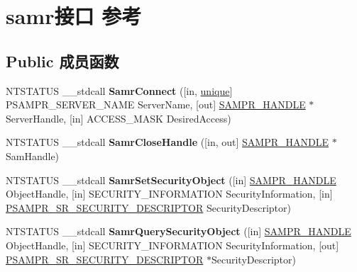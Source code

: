 \hypertarget{interfacesamr}{}\section{samr接口 参考}
\label{interfacesamr}
\subsection*{Public 成员函数}
\begin{DoxyCompactItemize}
\item 
\mbox{\label{interfacesamr_a52ebb23c3355cec821dcb121e5933050}} 
N\+T\+S\+T\+A\+T\+US \+\_\+\+\_\+stdcall {\bfseries Samr\+Connect} (\mbox{[}in, \hyperlink{interfaceunique}{unique}\mbox{]} P\+S\+A\+M\+P\+R\+\_\+\+S\+E\+R\+V\+E\+R\+\_\+\+N\+A\+ME Server\+Name, \mbox{[}out\mbox{]} \hyperlink{interfacevoid}{S\+A\+M\+P\+R\+\_\+\+H\+A\+N\+D\+LE} $\ast$Server\+Handle, \mbox{[}in\mbox{]} A\+C\+C\+E\+S\+S\+\_\+\+M\+A\+SK Desired\+Access)
\item 
\mbox{\label{interfacesamr_a1746c5563132b0d8cc469adaaa5db866}} 
N\+T\+S\+T\+A\+T\+US \+\_\+\+\_\+stdcall {\bfseries Samr\+Close\+Handle} (\mbox{[}in, out\mbox{]} \hyperlink{interfacevoid}{S\+A\+M\+P\+R\+\_\+\+H\+A\+N\+D\+LE} $\ast$Sam\+Handle)
\item 
\mbox{\label{interfacesamr_a596792225ba717d6ed8cef0a9fae774b}} 
N\+T\+S\+T\+A\+T\+US \+\_\+\+\_\+stdcall {\bfseries Samr\+Set\+Security\+Object} (\mbox{[}in\mbox{]} \hyperlink{interfacevoid}{S\+A\+M\+P\+R\+\_\+\+H\+A\+N\+D\+LE} Object\+Handle, \mbox{[}in\mbox{]} S\+E\+C\+U\+R\+I\+T\+Y\+\_\+\+I\+N\+F\+O\+R\+M\+A\+T\+I\+ON Security\+Information, \mbox{[}in\mbox{]} \hyperlink{struct___s_a_m_p_r___s_r___s_e_c_u_r_i_t_y___d_e_s_c_r_i_p_t_o_r}{P\+S\+A\+M\+P\+R\+\_\+\+S\+R\+\_\+\+S\+E\+C\+U\+R\+I\+T\+Y\+\_\+\+D\+E\+S\+C\+R\+I\+P\+T\+OR} Security\+Descriptor)
\item 
\mbox{\label{interfacesamr_a89716227ef0f62dea90d8f19667fdf8f}} 
N\+T\+S\+T\+A\+T\+US \+\_\+\+\_\+stdcall {\bfseries Samr\+Query\+Security\+Object} (\mbox{[}in\mbox{]} \hyperlink{interfacevoid}{S\+A\+M\+P\+R\+\_\+\+H\+A\+N\+D\+LE} Object\+Handle, \mbox{[}in\mbox{]} S\+E\+C\+U\+R\+I\+T\+Y\+\_\+\+I\+N\+F\+O\+R\+M\+A\+T\+I\+ON Security\+Information, \mbox{[}out\mbox{]} \hyperlink{struct___s_a_m_p_r___s_r___s_e_c_u_r_i_t_y___d_e_s_c_r_i_p_t_o_r}{P\+S\+A\+M\+P\+R\+\_\+\+S\+R\+\_\+\+S\+E\+C\+U\+R\+I\+T\+Y\+\_\+\+D\+E\+S\+C\+R\+I\+P\+T\+OR} $\ast$Security\+Descriptor)

\end{DoxyCompactItemize}
